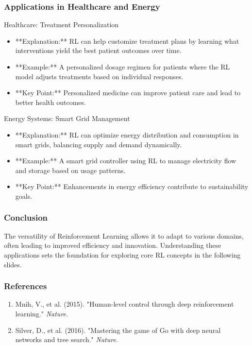 \documentclass[aspectratio=169]{beamer}
\begin{document}
\begin{frame}[fragile]
    \frametitle{Applications in Healthcare and Energy}
    \begin{block}{Healthcare: Treatment Personalization}
        \begin{itemize}
            \item **Explanation:** RL can help customize treatment plans by learning what interventions yield the best patient outcomes over time.
            \item **Example:** A personalized dosage regimen for patients where the RL model adjusts treatments based on individual responses.
            \item **Key Point:** Personalized medicine can improve patient care and lead to better health outcomes.
        \end{itemize}
    \end{block}
    
    \begin{block}{Energy Systems: Smart Grid Management}
        \begin{itemize}
            \item **Explanation:** RL can optimize energy distribution and consumption in smart grids, balancing supply and demand dynamically.
            \item **Example:** A smart grid controller using RL to manage electricity flow and storage based on usage patterns.
            \item **Key Point:** Enhancements in energy efficiency contribute to sustainability goals.
        \end{itemize}
    \end{block}
\end{frame}

\begin{frame}[fragile]
    \frametitle{Conclusion}
    The versatility of Reinforcement Learning allows it to adapt to various domains, often leading to improved efficiency and innovation. Understanding these applications sets the foundation for exploring core RL concepts in the following slides.
\end{frame}

\begin{frame}[fragile]
    \frametitle{References}
    \begin{enumerate}
        \item Mnih, V., et al. (2015). "Human-level control through deep reinforcement learning." \textit{Nature}.
        \item Silver, D., et al. (2016). "Mastering the game of Go with deep neural networks and tree search." \textit{Nature}.
    \end{enumerate}
\end{frame}
\end{document}
